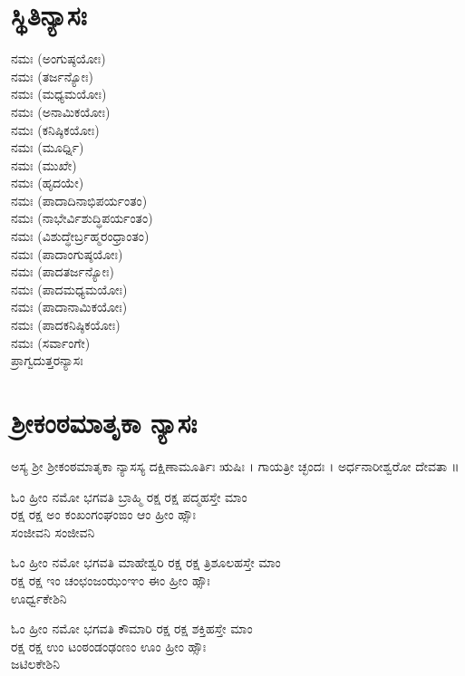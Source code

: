 \section{ಸ್ಥಿತಿನ್ಯಾಸಃ}
 ನಮಃ (ಅಂಗುಷ್ಠಯೋಃ)\\
 ನಮಃ (ತರ್ಜನ್ಯೋಃ)\\
 ನಮಃ (ಮಧ್ಯಮಯೋಃ)\\
 ನಮಃ (ಅನಾಮಿಕಯೋಃ)\\
 ನಮಃ (ಕನಿಷ್ಠಿಕಯೋಃ)\\
 ನಮಃ (ಮೂರ್ಧ್ನಿ)\\
 ನಮಃ (ಮುಖೇ)\\
 ನಮಃ (ಹೃದಯೇ)\\
 ನಮಃ (ಪಾದಾದಿನಾಭಿಪರ್ಯಂತಂ)\\
 ನಮಃ (ನಾಭೇರ್ವಿಶುದ್ಧಿಪರ್ಯಂತಂ)\\
 ನಮಃ (ವಿಶುದ್ಧೇರ್ಬ್ರಹ್ಮರಂಧ್ರಾಂತಂ)\\
 ನಮಃ (ಪಾದಾಂಗುಷ್ಠಯೋಃ)\\
 ನಮಃ (ಪಾದತರ್ಜನ್ಯೋಃ)\\
 ನಮಃ (ಪಾದಮಧ್ಯಮಯೋಃ)\\
 ನಮಃ (ಪಾದಾನಾಮಿಕಯೋಃ)\\
 ನಮಃ (ಪಾದಕನಿಷ್ಠಿಕಯೋಃ)\\
 ನಮಃ (ಸರ್ವಾಂಗೇ)\\
ಪ್ರಾಗ್ವದುತ್ತರನ್ಯಾಸಃ

\section{ಶ್ರೀಕಂಠಮಾತೃಕಾ ನ್ಯಾಸಃ}
ಅಸ್ಯ ಶ್ರೀ ಶ್ರೀಕಂಠಮಾತೃಕಾ ನ್ಯಾಸಸ್ಯ ದಕ್ಷಿಣಾಮೂರ್ತಿಃ ಋಷಿಃ । ಗಾಯತ್ರೀ ಚ್ಛಂದಃ । ಅರ್ಧನಾರೀಶ್ವರೋ ದೇವತಾ ॥

ಓಂ ಹ್ರೀಂ ನಮೋ ಭಗವತಿ ಬ್ರಾಹ್ಮಿ ರಕ್ಷ ರಕ್ಷ ಪದ್ಮಹಸ್ತೇ ಮಾಂ\\ ರಕ್ಷ ರಕ್ಷ  ಅಂ ಕಂಖಂಗಂಘಂಙಂ ಆಂ ಹ್ರೀಂ ಹ್ಸೌಃ \\ಸಂಜೀವನಿ ಸಂಜೀವನಿ  

ಓಂ ಹ್ರೀಂ ನಮೋ ಭಗವತಿ ಮಾಹೇಶ್ವರಿ ರಕ್ಷ ರಕ್ಷ ತ್ರಿಶೂಲಹಸ್ತೇ ಮಾಂ \\ರಕ್ಷ ರಕ್ಷ ಇಂ ಚಂಛಂಜಂಝಂಞಂ ಈಂ  ಹ್ರೀಂ ಹ್ಸೌಃ\\ ಊರ್ಧ್ವಕೇಶಿನಿ 

ಓಂ ಹ್ರೀಂ ನಮೋ ಭಗವತಿ ಕೌಮಾರಿ ರಕ್ಷ ರಕ್ಷ ಶಕ್ತಿಹಸ್ತೇ ಮಾಂ\\ ರಕ್ಷ ರಕ್ಷ ಉಂ ಟಂಠಂಡಂಢಂಣಂ ಊಂ  ಹ್ರೀಂ ಹ್ಸೌಃ\\ ಜಟಿಲಕೇಶಿನಿ 


